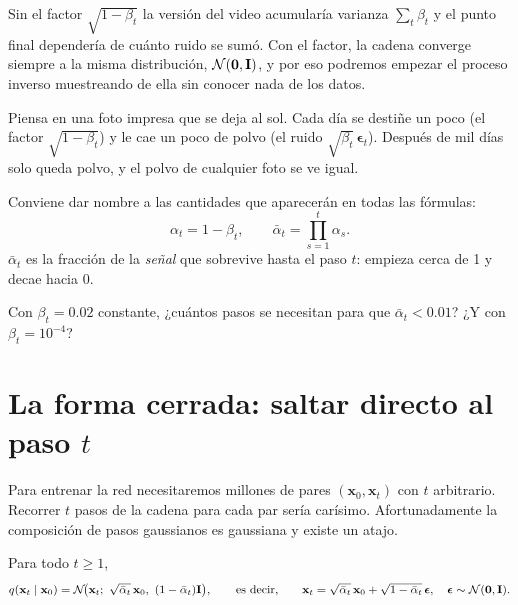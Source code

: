 \documentclass[11pt,letterpaper,oneside]{report}
\newcommand{\xb}{\mathbf{x}}
\newcommand{\eb}{\boldsymbol{\epsilon}}
\newcommand{\Ib}{\mathbf{I}}
\newcommand{\ab}{\bar{\alpha}}
\begin{document}
Sin el factor $\sqrt{1-\beta_t}$ la versión del video acumularía varianza $\sum_t\beta_t$ y el punto final dependería de cuánto ruido se sumó. Con el factor, la cadena converge siempre a la misma distribución, $\Normal(\mathbf 0,\Ib)$, y por eso podremos empezar el proceso inverso muestreando de ella sin conocer nada de los datos.

\begin{intuicion}
Piensa en una foto impresa que se deja al sol. Cada día se destiñe un poco (el factor $\sqrt{1-\beta_t}$) y le cae un poco de polvo (el ruido $\sqrt{\beta_t}\,\eb_t$). Después de mil días solo queda polvo, y el polvo de cualquier foto se ve igual.
\end{intuicion}

Conviene dar nombre a las cantidades que aparecerán en todas las fórmulas:
\[
\alpha_t=1-\beta_t,\qquad \ab_t=\prod_{s=1}^t\alpha_s .
\]
$\ab_t$ es la fracción de la \emph{señal} que sobrevive hasta el paso $t$: empieza cerca de 1 y decae hacia 0.

\begin{ejercicio}
Con $\beta_t=0.02$ constante, ¿cuántos pasos se necesitan para que $\ab_t<0.01$? ¿Y con $\beta_t=10^{-4}$?
\end{ejercicio}

\section{La forma cerrada: saltar directo al paso $t$}\label{sec:cerrada}

Para entrenar la red necesitaremos millones de pares $(\xb_0,\xb_t)$ con $t$ arbitrario. Recorrer $t$ pasos de la cadena para cada par sería carísimo. Afortunadamente la composición de pasos gaussianos es gaussiana y existe un atajo.

\begin{teorema}\label{res:cerrada}
Para todo $t\geq1$,
\[
q(\xb_t\mid\xb_0)=\Normal\!\big(\xb_t;\ \sqrt{\ab_t}\,\xb_0,\ (1-\ab_t)\Ib\big),
\qquad\text{es decir,}\qquad
\xb_t=\sqrt{\ab_t}\,\xb_0+\sqrt{1-\ab_t}\,\eb,\quad \eb\sim\Normal(\mathbf 0,\Ib).
\]
\end{teorema}
\end{document}
